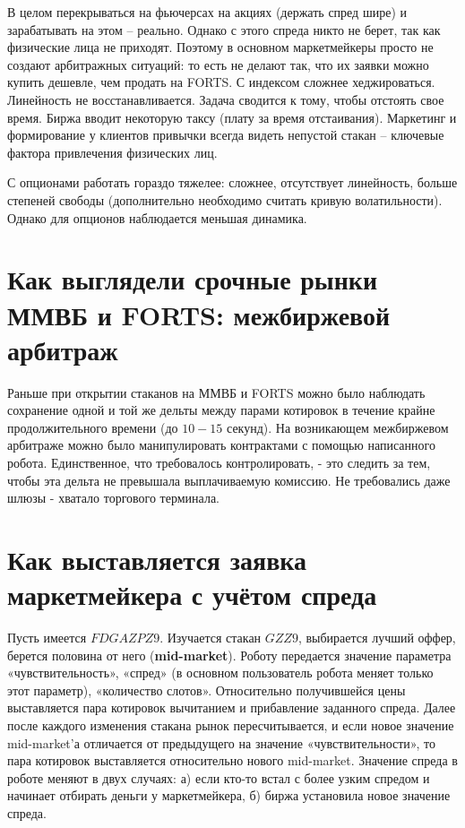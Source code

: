 \documentclass{article}
\begin{document}
В целом перекрываться на фьючерсах на акциях (держать спред шире) и зарабатывать на этом – реально. Однако с этого спреда никто не берет, так как физические лица не приходят. Поэтому в основном маркетмейкеры просто не создают арбитражных ситуаций: то есть не делают так, что их заявки можно купить дешевле, чем продать на FORTS. С индексом сложнее хеджироваться. Линейность не восстанавливается. Задача сводится к тому, чтобы отстоять свое время. Биржа вводит некоторую таксу (плату за время отстаивания). Маркетинг и формирование у клиентов привычки всегда видеть непустой стакан – ключевые фактора привлечения физических лиц.

С опционами работать гораздо тяжелее: сложнее, отсутствует линейность, больше степеней свободы (дополнительно необходимо считать кривую волатильности). Однако для опционов наблюдается меньшая динамика. 

\section{Как выглядели срочные рынки ММВБ и FORTS: межбиржевой арбитраж}

Раньше при открытии стаканов на ММВБ и FORTS можно было наблюдать сохранение одной и той же дельты между парами котировок в течение крайне продолжительного времени (до $ 10-15 $ секунд). На возникающем межбиржевом арбитраже можно было манипулировать контрактами с помощью написанного робота. Единственное, что требовалось контролировать, - это следить за тем, чтобы эта дельта не превышала выплачиваемую комиссию. Не требовались даже шлюзы - хватало торгового терминала. 

\section{Как выставляется заявка маркетмейкера с учётом спреда}

Пусть имеется $ FDGAZPZ9 $. Изучается стакан $ GZZ9 $, выбирается лучший оффер, берется половина от него (\textbf{mid-market}). Роботу передается значение параметра «чувствительность», «спред» (в основном пользователь робота меняет только этот параметр), «количество слотов». Относительно получившейся цены выставляется пара котировок вычитанием и прибавление заданного спреда. Далее после каждого изменения стакана рынок пересчитывается, и если новое значение mid-market'а отличается от предыдущего на значение «чувствительности», то пара котировок выставляется относительно нового mid-market. Значение спреда в роботе меняют в двух случаях: а) если кто-то встал с более узким спредом и начинает отбирать деньги у маркетмейкера, б) биржа установила новое значение спреда. 
\end{document}
